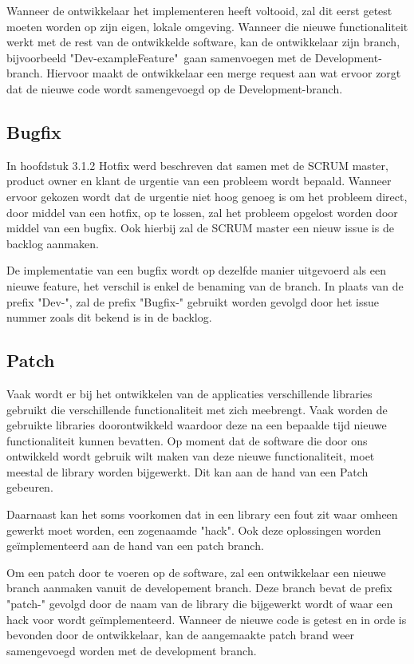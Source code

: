 	
	Wanneer de ontwikkelaar het implementeren heeft voltooid, zal dit eerst getest moeten worden op zijn eigen, lokale omgeving. Wanneer die nieuwe functionaliteit werkt met de rest van de ontwikkelde software, kan de ontwikkelaar zijn branch, bijvoorbeeld "Dev-exampleFeature"\ gaan samenvoegen met de Development-branch. Hiervoor maakt de ontwikkelaar een merge request aan wat ervoor zorgt dat de nieuwe code wordt samengevoegd op de Development-branch.
	
	\subsection{Bugfix}
	In hoofdstuk 3.1.2 Hotfix werd beschreven dat samen met de SCRUM master, product owner en klant de urgentie van een probleem wordt bepaald.
	Wanneer ervoor gekozen wordt dat de urgentie niet hoog genoeg is om het probleem direct, door middel van een hotfix, op te lossen, zal het probleem opgelost worden door middel van een bugfix. Ook hierbij zal de SCRUM master een nieuw issue is de backlog aanmaken.
	
	De implementatie van een bugfix wordt op dezelfde manier uitgevoerd als een nieuwe feature, het verschil is enkel de benaming van de branch. In plaats van de prefix "Dev-", zal de prefix "Bugfix-" gebruikt worden gevolgd door het issue nummer zoals dit bekend is in de backlog.

	\subsection{Patch}
	Vaak wordt er bij het ontwikkelen van de applicaties verschillende libraries gebruikt die verschillende functionaliteit met zich meebrengt. Vaak worden de gebruikte libraries doorontwikkeld waardoor deze na een bepaalde tijd nieuwe functionaliteit kunnen bevatten. Op moment dat de software die door ons ontwikkeld wordt gebruik wilt maken van deze nieuwe functionaliteit, moet meestal de library worden bijgewerkt. Dit kan aan de hand van een Patch gebeuren. 
	
	Daarnaast kan het soms voorkomen dat in een library een fout zit waar omheen gewerkt moet worden, een zogenaamde "hack". Ook deze oplossingen worden geïmplementeerd aan de hand van een patch branch.
	
	Om een patch door te voeren op de software, zal een ontwikkelaar een nieuwe branch aanmaken vanuit de developement branch. Deze branch bevat de prefix "patch-" gevolgd door de naam van de library die bijgewerkt wordt of waar een hack voor wordt geïmplementeerd. Wanneer de nieuwe code is getest en in orde is bevonden door de ontwikkelaar, kan de aangemaakte patch brand weer samengevoegd worden met de development branch.